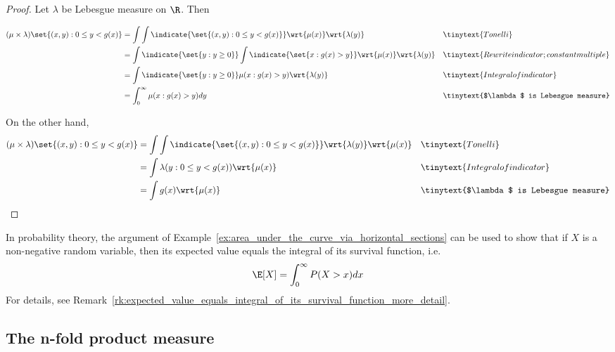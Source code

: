 \documentclass{article} %
\begin{document}
\begin{proof}
Let $\lambda$ be Lebesgue measure on $\R$.  Then 

\begin{align*}
(\mu \times \lambda)\set{(x,y): 0 \leq y < g(x)} &= \int \int \indicate{\set{(x,y): 0 \leq y < g(x)}} \wrt{\mu(x)} \wrt{\lambda(y)} && \tinytext{Tonelli} \\
&= \int \indicate{\set{y: y \geq 0}} \int \indicate{\set{x: g(x) >y}}  \wrt{\mu(x)} \wrt{\lambda(y)} && \tinytext{Rewrite indicator; constant multiple} \\
 &= \int \indicate{\set{y: y \geq 0}}  \mu(x: g(x) > y) \wrt{\lambda(y)} && \tinytext{Integral of indicator} \\
 &= \int_0^\infty \mu(x: g(x) > y) dy && \tinytext{$\lambda$ is Lebesgue measure} \\
\end{align*}

On the other hand,
\begin{align*}
(\mu \times \lambda)\set{(x,y): 0 \leq y < g(x)} &= \int \int \indicate{\set{(x,y): 0 \leq y < g(x)}}  \wrt{\lambda(y)} \wrt{\mu(x)} && \tinytext{Tonelli} \\
 &= \int   \lambda(y: 0 \leq y < g(x)) \wrt{\mu(x)} && \tinytext{Integral of indicator} \\
&= \int   g(x) \wrt{\mu(x)} && \tinytext{$\lambda$ is Lebesgue measure} \\
\end{align*}	

\end{proof}


\begin{remark}
In probability theory, the argument of Example~\ref{ex:area_under_the_curve_via_horizontal_sections} can be used to show that if $X$ is a non-negative random variable, then its expected value equals the integral of its survival function, i.e. 
\[ \E[X] = \int_0^\infty P(X > x) dx \]
For details, see Remark~\ref{rk:expected_value_equals_integral_of_its_survival_function_more_detail}. 
\label{rk:expected_value_equals_integral_of_its_survival_function}
\end{remark}


\subsection{The n-fold product measure}
\end{document}
